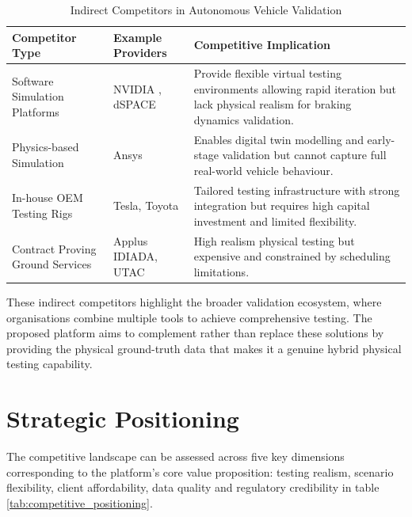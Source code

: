 \documentclass[11pt, a4paper]{report}
\numberwithin{equation}{section}
\begin{document}
\begin{refsection}
\begin{table}[h]
\centering
\caption{Indirect Competitors in Autonomous Vehicle Validation}
\label{tab:indirect_competitors}
\footnotesize
\singlespacing
\begin{tabularx}{\textwidth}{|p{2.8cm}|p{3.2cm}|X|}
\hline
\textbf{Competitor Type} & \textbf{Example Providers} & \textbf{Competitive Implication} \\
\hline
Software Simulation Platforms & NVIDIA \cite{nvidia_drive_sim}, dSPACE & Provide flexible virtual testing environments allowing rapid iteration but lack physical realism for braking dynamics validation. \\
\hline
Physics-based Simulation & Ansys \cite{ansys_autonomy} & Enables digital twin modelling and early-stage validation but cannot capture full real-world vehicle behaviour. \\
\hline
In-house OEM Testing Rigs & Tesla, Toyota & Tailored testing infrastructure with strong integration but requires high capital investment and limited flexibility. \\
\hline
Contract Proving Ground Services & Applus IDIADA, UTAC \cite{utac_millbrook} & High realism physical testing but expensive and constrained by scheduling limitations. \\
\hline
\end{tabularx}
\end{table}

These indirect competitors highlight the broader validation ecosystem, where organisations combine multiple tools to achieve comprehensive testing. The proposed platform aims to complement rather than replace these solutions by providing  the physical ground-truth data that makes it a genuine hybrid physical testing capability.

\section{Strategic Positioning}
\label{sec:ch6-strategic-positioning}
The competitive landscape can be assessed across five key dimensions corresponding to the platform's core value proposition: testing realism, scenario flexibility, client affordability, data quality and regulatory credibility in table \ref{tab:competitive_positioning}.



\end{refsection}
\end{document}
